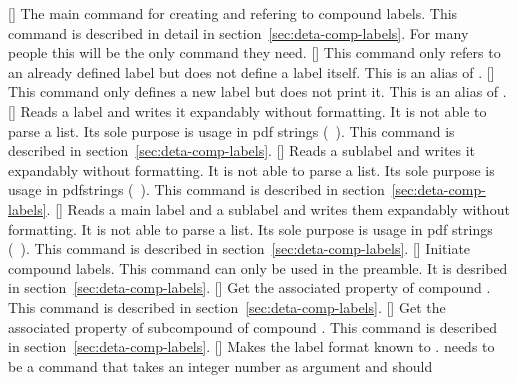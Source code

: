 \documentclass[load-preamble+,babel-options={ngerman,british,american}]{cnltx-doc}
\begin{document}
\begin{commands}
  [\sarg\code{+}]
    The main command for creating and refering to compound labels.  This
    command is described in detail in section~\ref{sec:deta-comp-labels}.  For
    many people this will be the only command they need.
  []
    This command only refers to an already defined label but does not define a
    label itself.  This is an alias of \code{+}.
  []
    This command only defines a new label but does not print it.  This is an
    alias of \sarg.
  \expandable{}[]
    Reads a label and writes it expandably without formatting.  It is not able
    to parse a list.  Its sole purpose is usage in \ac{pdf} strings
    (\cf\ \marg{\TeX}).  This
    command is described in section~\ref{sec:deta-comp-labels}.
  \expandable{}[]
    Reads a sublabel and writes it expandably without formatting.  It is not
    able to parse a list.  Its sole purpose is usage in pdfstrings
    (\cf\ \marg{\TeX}).  This
    command is described in section~\ref{sec:deta-comp-labels}.
  \expandable{}[]
    Reads a main label and a sublabel and writes them expandably without
    formatting.  It is not able to parse a list.  Its sole purpose is usage in
    \ac{pdf} strings (\cf\ \marg{\TeX}). This command is described in
    section~\ref{sec:deta-comp-labels}.
  []
    Initiate compound labels.  This command can only be used in the preamble.
    It is desribed in section~\ref{sec:deta-comp-labels}.
  \expandable{}[]
    Get the associated property  of compound
    . This command is described in
    section~\ref{sec:deta-comp-labels}.
  \expandable{}[]
    Get the associated property  of subcompound  of compound .  This command is described
    in section~\ref{sec:deta-comp-labels}.
  []
    Makes the label format  known to \chemnum.  
    needs to be a command that takes an integer number as argument and should

\end{commands}
\end{document}
